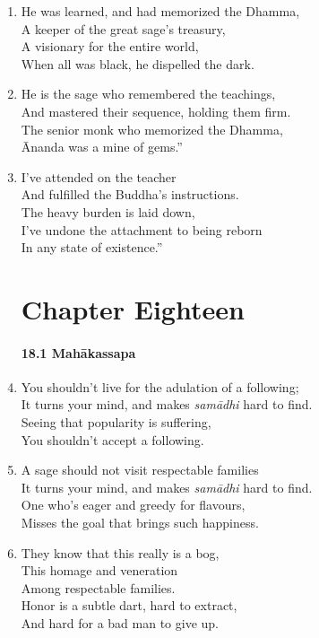 \documentclass[10pt, openany]{book}
\newcommand*{\vleftofline}[1]{\leavevmode\llap{#1}}
\begin{document}
\begin{enumerate}
\item He was learned, and had memorized the Dhamma,\\
A keeper of the great sage’s treasury,\\
A visionary for the entire world,\\
When all was black, he dispelled the dark.

\item He is the sage who remembered the teachings,\\
And mastered their sequence, holding them firm.\\
The senior monk who memorized the Dhamma,\\
Ānanda was a mine of gems.”

\item \vleftofline{“}I’ve attended on the teacher\\
And fulfilled the Buddha’s instructions.\\
The heavy burden is laid down,\\
I’ve undone the attachment to being reborn \\
In any state of existence.”

\chapter*{Chapter Eighteen}

\subsubsection*{18.1 Mahākassapa}

\item You shouldn’t live for the adulation of a following;\\
It turns your mind, and makes \emph{samādhi} hard to find.\\
Seeing that popularity is suffering,\\
You shouldn’t accept a following.

\item A sage should not visit respectable families\\
It turns your mind, and makes \emph{samādhi} hard to find.\\
One who’s eager and greedy for flavours,\\
Misses the goal that brings such happiness.

\item They know that this really is a bog,\\
This homage and veneration \\
Among respectable families.\\
Honor is a subtle dart, hard to extract,\\
And hard for a bad man to give up.


\end{enumerate}
\end{document}
